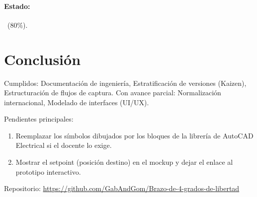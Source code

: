 \documentclass[a4paper,11pt]{article}
\begin{document}
\paragraph{Estado:} \parcial~(80\%).
\section{Conclusión}
Cumplidos: Documentación de ingeniería, Estratificación de versiones (Kaizen), Estructuración de flujos de captura. Con avance parcial: Normalización internacional, Modelado de interfaces (UI/UX).
\par\smallskip Pendientes principales:
\begin{enumerate}
\item Reemplazar los símbolos dibujados por los bloques de la librería de AutoCAD Electrical si el docente lo exige.
\item Mostrar el setpoint (posición destino) en el mockup y dejar el enlace al prototipo interactivo.
\end{enumerate}
\par\smallskip\noindent Repositorio: \url{https://github.com/GabAndGom/Brazo-de-4-grados-de-libertad}
\end{document}
